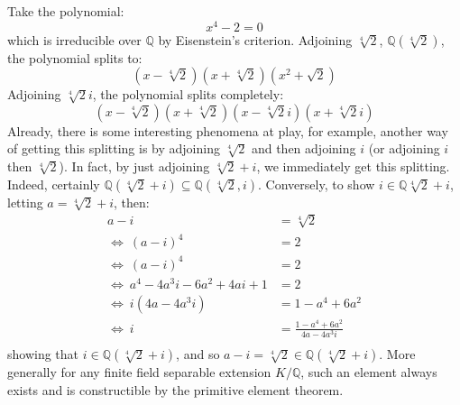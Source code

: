 \documentclass{article}
\newcommand{\Q}{{\mathbb{Q}}}
\newcommand{\sse}{\subseteq}
\newcommand{\LRw}{\Leftrightarrow}
\begin{document}
Take the polynomial:
\[
	x^4-2=0
\]
which is irreducible over $\Q$ by Eisenstein's criterion. Adjoining
$\sqrt[4]{2}$, $\Q(\sqrt[4]{2})$, the polynomial splits to:
\[
	(x-\sqrt[4]{2})(x+\sqrt[4]{2})(x^2+\sqrt{2})
\]
Adjoining $\sqrt[4]{2}i$, the polynomial splits completely:
\begin{equation}\label{eq:forthRootOf2}
	(x-\sqrt[4]{2})(x+\sqrt[4]{2})(x-\sqrt[4]{2}i)(x+\sqrt[4]{2}i)
\end{equation}
Already, there is some interesting phenomena at play, for example, another way of getting this splitting is by adjoining
$\sqrt[4]{2}$ and then adjoining $i$ (or adjoining $i$ then $\sqrt[4]{2}$). In
fact, by just adjoining $\sqrt[4]{2} + i$, we immediately get this splitting. Indeed, certainly $\Q(\sqrt[4]{2} + i)
\sse \Q(\sqrt[4]{2}, i)$. Conversely, to show $i \in \Q\sqrt[4]{2}+i$, letting $a = \sqrt[4]{2}+i$, then:
\begin{align*}
	a-i &= \sqrt[4]{2}\\
	\LRw\ (a-i)^4 &= 2\\
	\LRw\ (a-i)^4 &= 2\\
	\LRw\ a^4 - 4a^3i - 6a^2 + 4ai + 1 &= 2\\
	\LRw\  i(4a- 4a^3i) &= 1-a^4+ 6a^2\\
	\LRw\  i &= \frac{1-a^4+ 6a^2}{4a- 4a^3i}\\
\end{align*}
showing that $i \in \Q(\sqrt[4]{2}+i)$, and so $a-i = \sqrt[4]{2} \in \Q(\sqrt[4]{2}+i)$. More generally for
any finite field separable extension $K/\Q$, such an element always exists and is constructible by the
primitive element theorem.
\end{document}

